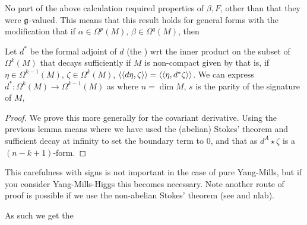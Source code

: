 \documentclass{article}
\begin{document}
\begin{remark}
	No part of the above calculation required properties of $\beta, F$, other than that they were $\mathfrak{g}$-valued. This means that this result holds for general forms with the modification that if $\alpha \in \Omega^p(M), \, \beta \in \Omega^q(M)$, then 
\end{remark}

\begin{lemma}
	Let $d^\ast$ be the formal adjoint of $d$ (the ) wrt the inner product on the subset of $\Omega^k(M)$ that decays sufficiently if $M$ is non-compact given by
that is, if $\eta \in \Omega^{k-1}(M), \, \zeta \in \Omega^{k}(M)$, $\left\langle \left\langle d\eta, \zeta \right\rangle \right\rangle = \left\langle \left\langle \eta,d^\ast \zeta \right\rangle \right\rangle$. We can express $d^\ast : \Omega^k(M) \to \Omega^{k-1}(M)$ as 
where $n=\dim M$, $s$ is the parity of the signature of $M$, 
\end{lemma}
\begin{proof}
We prove this more generally for the covariant derivative. Using the previous lemma means 
where we have used the (abelian) Stokes' theorem and sufficient decay at infinity to set the boundary term to 0, and that as $d^A \star \zeta$ is a $(n-k+1)$-form. 
\end{proof} 

\begin{remark}
	This carefulness with signs is not important in the case of pure Yang-Mills, but if you consider Yang-Mills-Higgs this becomes necessary. Note another route of proof is possible if we use the non-abelian Stokes' theorem (see \cite{Schreiber2011} and nlab).
\end{remark}
As such we get the 
\end{document}
